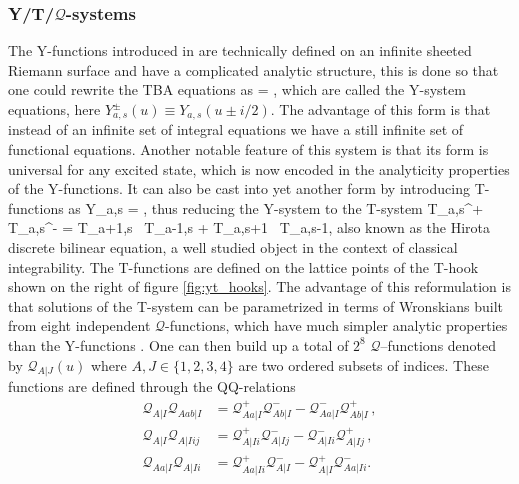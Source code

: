 \subsubsection{Y/T/$\mathcal{Q}$-systems}

The Y-functions introduced in  are technically defined on an infinite sheeted Riemann surface and have a complicated analytic structure, this is done so that one could rewrite the TBA equations as \cite{Gromov:2009bc, Cavaglia:2010nm}
\beq
	\label{eq:ysystem}
	 = ,
\eeq
which are called the Y-system equations, here $Y^\pm_{a,s}(u) \equiv Y_{a,s}(u \pm i/2)$.
The advantage of this form is that instead of an infinite set of integral equations we have a still infinite set of functional equations.
Another notable feature of this system is that its form is universal for any excited state, which is now encoded in the analyticity properties of the Y-functions. 
It can also be cast into yet another form by introducing T-functions as
\beq
	Y_{a,s} = ,
\eeq
thus reducing the Y-system to the T-system
\beq
	T_{a,s}^+ \, T_{a,s}^- = T_{a+1,s} \, T_{a-1,s} + T_{a,s+1} \,  T_{a,s-1},
\eeq
also known as the Hirota discrete bilinear equation, a well studied object in the context of classical integrability.
The T-functions are defined on the lattice points of the T-hook shown on the right of figure \ref{fig:yt_hooks}.
The advantage of this reformulation is that solutions of the T-system can be parametrized in terms of Wronskians built from eight independent $\mathcal{Q}$-functions, which have much simpler analytic properties than the Y-functions \cite{Gromov:2010km}.
One can then build up a total of $2^8$ $\mathcal{Q}$--functions denoted by $\mathcal{Q}_{A|J}(u)$ where $A,J \in \{1,2,3,4\}$ are two ordered subsets of indices.
These functions are defined through the QQ-relations
\begin{subequations}\label{definingQQ}
    \begin{align}
       \label{QQbb}
       \mathcal{Q}_{A|I}\mathcal{Q}_{A ab|I} &=\mathcal{Q}_{A a|I}^{+} \mathcal{Q}_{A b|I}^{-}-
       \mathcal{Q}_{A a|I}^{-}
       \mathcal{Q}_{A b|I}^{+}\,,\\
       \label{QQff}
       \mathcal{Q}_{A|I}\mathcal{Q}_{A|I ij} &=\mathcal{Q}_{A|I i}^{+} \mathcal{Q}_{A|I j}^{-}-
       \mathcal{Q}_{A|I i}^{-} \mathcal{Q}_{A|I j}^{+}\,,\\
       \label{QQbf}
       \mathcal{Q}_{A a|I}\mathcal{Q}_{A|I i} &= \mathcal{Q}_{A a|I i}^{+}\mathcal{Q}_{A|I}^{-}-
       \mathcal{Q}_{A|I}^{+} \mathcal{Q}_{A a|I i}^{-}. \,
     \end{align}
\end{subequations} 
